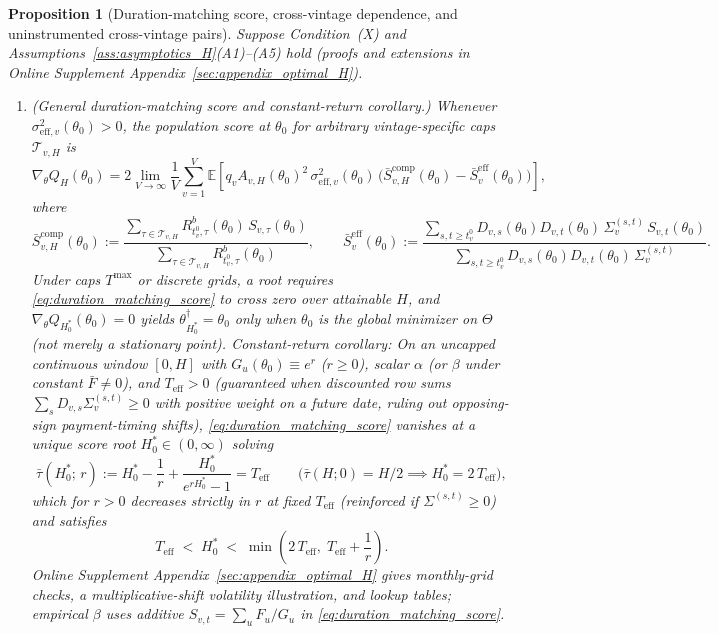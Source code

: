 \documentclass[12pt]{article}
\newtheorem{proposition}{Proposition}
\begin{document}
\begin{proposition}[Duration-matching score, cross-vintage dependence, and uninstrumented cross-vintage pairs]
\label{prop:optimal_H}
Suppose Condition~(X) and Assumptions~\ref{ass:asymptotics_H}(A1)--(A5) hold (proofs and extensions in Online Supplement Appendix~\ref{sec:appendix_optimal_H}).
\begin{enumerate}
  \item[\textbf{(i)}] \emph{(General duration-matching score and constant-return corollary.)}
  Whenever $\sigma_{\mathrm{eff},v}^2(\theta_0) > 0$, the population score at $\theta_0$ for arbitrary vintage-specific caps $\mathcal{T}_{v,H}$ is
  \begin{equation}
  \label{eq:duration_matching_score}
  \nabla_\theta Q_H(\theta_0)
  = 2 \lim_{V\to\infty}\frac{1}{V}\sum_{v=1}^V \mathbb{E}\!\left[q_v A_{v,H}(\theta_0)^2\,\sigma_{\mathrm{eff},v}^2(\theta_0)\,\Big(\bar{S}_{v,H}^{\mathrm{comp}}(\theta_0) - \bar{S}_v^{\mathrm{eff}}(\theta_0)\Big)\right],
  \end{equation}
  where
  \[
  \bar{S}_{v,H}^{\mathrm{comp}}(\theta_0) := \frac{\sum_{\tau\in\mathcal{T}_{v,H}} R^b_{t_v^0,\tau}(\theta_0)\,S_{v,\tau}(\theta_0)}{\sum_{\tau\in\mathcal{T}_{v,H}} R^b_{t_v^0,\tau}(\theta_0)},
  \qquad
  \bar{S}_v^{\mathrm{eff}}(\theta_0) := \frac{\sum_{s,t\ge t_v^0} D_{v,s}(\theta_0)D_{v,t}(\theta_0)\,\Sigma_v^{(s,t)}\,S_{v,t}(\theta_0)}{\sum_{s,t\ge t_v^0} D_{v,s}(\theta_0)D_{v,t}(\theta_0)\,\Sigma_v^{(s,t)}}.
  \]
  Under caps $T^{\max}$ or discrete grids, a root requires \eqref{eq:duration_matching_score} to cross zero over attainable $H$, and $\nabla_\theta Q_{H_0^\ast}(\theta_0)=0$ yields $\theta_{H_0^\ast}^\dagger = \theta_0$ only when $\theta_0$ is the global minimizer on $\Theta$ (not merely a stationary point).
  \emph{Constant-return corollary:} On an uncapped continuous window $[0,H]$ with $G_u(\theta_0) \equiv e^r$ ($r \ge 0$), scalar $\alpha$ (or $\beta$ under constant $\bar{F} \neq 0$), and $T_{\mathrm{eff}} > 0$ (guaranteed when discounted row sums $\sum_s D_{v,s}\Sigma_v^{(s,t)} \ge 0$ with positive weight on a future date, ruling out opposing-sign payment-timing shifts), \eqref{eq:duration_matching_score} vanishes at a unique score root $H_0^\ast \in (0,\infty)$ solving
  \begin{equation}
  \label{eq:exact_tau_bar}
  \bar\tau(H_0^\ast;\, r) := H_0^\ast - \frac{1}{r} + \frac{H_0^\ast}{e^{r H_0^\ast} - 1} = T_{\mathrm{eff}}
  \qquad\bigl(\bar\tau(H;0) = H/2 \implies H_0^\ast = 2\,T_{\mathrm{eff}}\bigr),
  \end{equation}
  which for $r > 0$ decreases strictly in $r$ at fixed $T_{\mathrm{eff}}$ (reinforced if $\Sigma^{(s,t)} \ge 0$) and satisfies
  \begin{equation}
  \label{eq:H_star_bounds}
  T_{\mathrm{eff}} \;<\; H_0^\ast \;<\; \min\!\left(2\,T_{\mathrm{eff}},\; T_{\mathrm{eff}} + \frac{1}{r}\right).
  \end{equation}
  Online Supplement Appendix~\ref{sec:appendix_optimal_H} gives monthly-grid checks, a multiplicative-shift volatility illustration, and lookup tables; empirical $\beta$ uses additive $S_{v,t} = \sum_u F_u/G_u$ in \eqref{eq:duration_matching_score}.


\end{enumerate}
\end{proposition}
\end{document}
